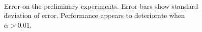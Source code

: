 \documentclass[a4paper,11pt]{article}
\begin{document}
\begin{center}
\begin{figure}
\\
\caption{Error on the preliminary experiments. Error bars show standard
deviation of error. Performance appears to deteriorate when $\alpha>0.01$.}
\label{fig:prelimerror}
\end{figure}
\end{center}
\end{document}
